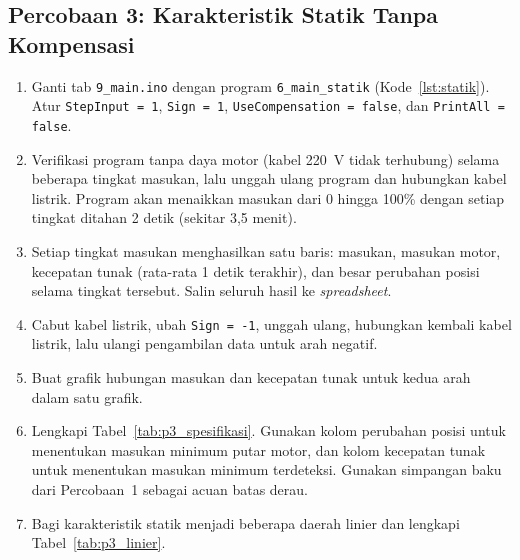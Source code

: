 \documentclass[11pt,a4paper]{article}
\newcommand{\prog}[1]{\texttt{#1}}
\begin{document}
\subsection{Percobaan 3: Karakteristik Statik Tanpa Kompensasi}
\begin{enumerate}
	\item Ganti tab \prog{9\_main.ino} dengan program \prog{6\_main\_statik} (Kode~\ref{lst:statik}). Atur \texttt{StepInput = 1}, \texttt{Sign = 1}, \texttt{UseCompensation = false}, dan \texttt{PrintAll = false}.
	\item Verifikasi program tanpa daya motor (kabel 220~V tidak terhubung) selama beberapa tingkat masukan, lalu unggah ulang program dan hubungkan kabel listrik. Program akan menaikkan masukan dari 0 hingga 100\% dengan setiap tingkat ditahan 2 detik (sekitar 3,5 menit).
	\item Setiap tingkat masukan menghasilkan satu baris: masukan, masukan motor, kecepatan tunak (rata-rata 1 detik terakhir), dan besar perubahan posisi selama tingkat tersebut. Salin seluruh hasil ke \textit{spreadsheet}.
	\item Cabut kabel listrik, ubah \texttt{Sign = -1}, unggah ulang, hubungkan kembali kabel listrik, lalu ulangi pengambilan data untuk arah negatif.
	\item Buat grafik hubungan masukan dan kecepatan tunak untuk kedua arah dalam satu grafik.
	\item Lengkapi Tabel~\ref{tab:p3_spesifikasi}. Gunakan kolom perubahan posisi untuk menentukan masukan minimum putar motor, dan kolom kecepatan tunak untuk menentukan masukan minimum terdeteksi. Gunakan simpangan baku dari Percobaan~1 sebagai acuan batas derau.
	\item Bagi karakteristik statik menjadi beberapa daerah linier dan lengkapi Tabel~\ref{tab:p3_linier}.
\end{enumerate}
\end{document}
